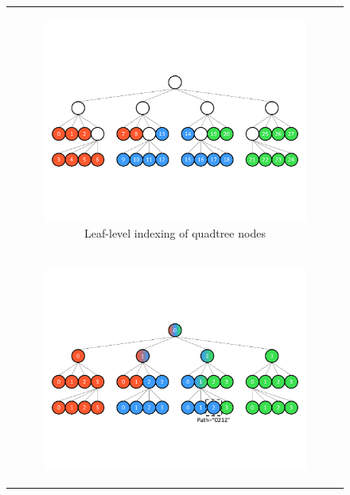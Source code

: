 \begin{figure}
    \centering
    \begin{tabular}{c}
    \smallskip
        \begin{subfigure}[t]{0.8\textwidth}
            \centering
            \includegraphics[width=\textwidth, clip=true, trim={0 150 0 150}]{figures/parallel_leaf_indexed_tree.pdf}
            \caption{Leaf-level indexing of quadtree nodes}
            \label{subfig:leaf-indexed-quadtree}
        \end{subfigure}
        \\
        \begin{subfigure}[t]{0.8\textwidth}
            \centering
            \includegraphics[width=\textwidth, clip=true, trim={0 140 0 150}]{figures/parallel_path_indexed_tree.pdf}

\end{subfigure}
\end{tabular}
\end{figure}
